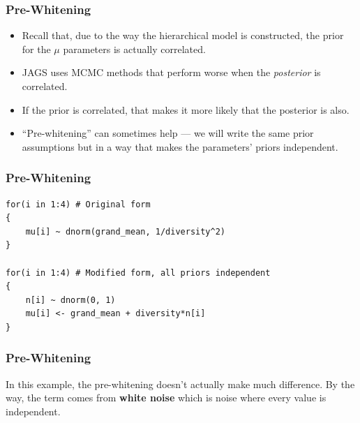 \documentclass{beamer}
\begin{document}
\begin{frame}[fragile]
\frametitle{Pre-Whitening}

\begin{itemize}
\item Recall that, due to the way the hierarchical model is constructed,
the prior for the $\mu$ parameters is actually correlated.\pause
\item JAGS uses MCMC methods that perform worse when the {\em posterior}
is correlated.\pause
\item If the prior is correlated, that makes it more likely that the posterior
is also.\pause
\item ``Pre-whitening'' can sometimes help --- we will write the same prior
assumptions but in a way that makes the parameters' priors independent.
\end{itemize}


\end{frame}

\begin{frame}[fragile]
\frametitle{Pre-Whitening}
\begin{verbatim}
for(i in 1:4) # Original form
{
    mu[i] ~ dnorm(grand_mean, 1/diversity^2)
}

for(i in 1:4) # Modified form, all priors independent
{
    n[i] ~ dnorm(0, 1)
    mu[i] <- grand_mean + diversity*n[i]
}
\end{verbatim}

\end{frame}


\begin{frame}[fragile]
\frametitle{Pre-Whitening}
In this example, the pre-whitening doesn't actually make much difference.
By the way, the term comes from {\bf white noise} which is noise where
every value is independent.
\end{frame}
\end{document}
